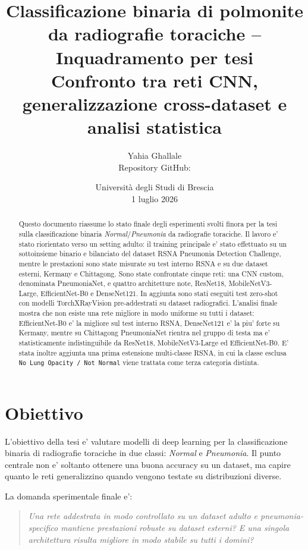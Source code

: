\documentclass[11pt,a4paper]{article}
\title{\textbf{Classificazione binaria di polmonite da radiografie toraciche -- Inquadramento per tesi}\\
\large Confronto tra reti CNN, generalizzazione cross-dataset e analisi statistica}
\author{Yahia Ghallale\\
\small Repository GitHub: \githuburl}
\date{Università degli Studi di Brescia \\ 1 luglio 2026}
\newcommand{\normal}{\textit{Normal}}
\newcommand{\pneumonia}{\textit{Pneumonia}}
\begin{document}
\maketitle

\begin{abstract}
Questo documento riassume lo stato finale degli esperimenti svolti finora per
la tesi sulla classificazione binaria \normal/\pneumonia{} da radiografie
toraciche. Il lavoro e' stato riorientato verso un setting adulto: il training
principale e' stato effettuato su un sottoinsieme binario e bilanciato del
dataset RSNA Pneumonia Detection Challenge, mentre le prestazioni sono state
misurate su test interno RSNA e su due dataset esterni, Kermany e Chittagong.
Sono state confrontate cinque reti: una CNN custom, denominata PneumoniaNet, e
quattro architetture note, ResNet18, MobileNetV3-Large, EfficientNet-B0 e
DenseNet121. In aggiunta sono stati eseguiti test zero-shot con modelli
TorchXRayVision pre-addestrati su dataset radiografici. L'analisi finale mostra
che non esiste una rete migliore in modo uniforme su tutti i dataset:
EfficientNet-B0 e' la migliore sul test interno RSNA, DenseNet121 e' la piu'
forte su Kermany, mentre su Chittagong PneumoniaNet rientra nel gruppo di testa
ma e' statisticamente indistinguibile da ResNet18, MobileNetV3-Large ed
EfficientNet-B0. E' stata inoltre aggiunta una prima estensione multi-classe
RSNA, in cui la classe esclusa \texttt{No Lung Opacity / Not Normal} viene
trattata come terza categoria distinta.
\end{abstract}

\tableofcontents
\newpage

\section{Obiettivo}

L'obiettivo della tesi e' valutare modelli di deep learning per la
classificazione binaria di radiografie toraciche in due classi:
\normal{} e \pneumonia. Il punto centrale non e' soltanto ottenere una buona
accuracy su un dataset, ma capire quanto le reti generalizzino quando vengono
testate su distribuzioni diverse.

La domanda sperimentale finale e':

\begin{quote}
\textit{Una rete addestrata in modo controllato su un dataset adulto e
pneumonia-specifico mantiene prestazioni robuste su dataset esterni? E una
singola architettura risulta migliore in modo stabile su tutti i domini?}
\end{quote}
\end{document}
